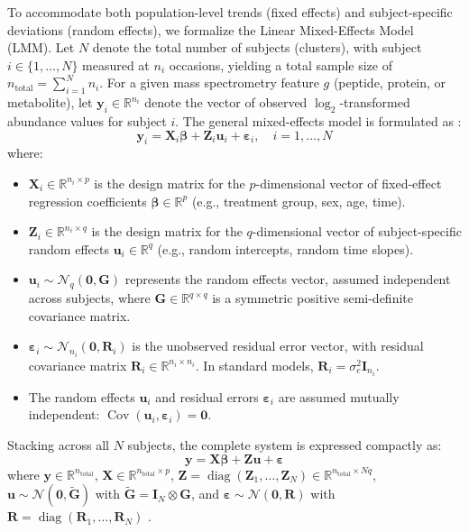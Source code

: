 \documentclass[11pt,twoside,openright]{book}
\begin{document}
To accommodate both population-level trends (fixed effects) and subject-specific deviations (random effects), we formalize the Linear Mixed-Effects Model (LMM). Let $N$ denote the total number of subjects (clusters), with subject $i \in \{1, \dots, N\}$ measured at $n_i$ occasions, yielding a total sample size of $n_{\text{total}} = \sum_{i=1}^N n_i$. For a given mass spectrometry feature $g$ (peptide, protein, or metabolite), let $\mathbf{y}_i \in \mathbb{R}^{n_i}$ denote the vector of observed $\log_2$-transformed abundance values for subject $i$. The general mixed-effects model is formulated as \cite{pinheiro2000mixed, laird1982random}:
\begin{equation}
\label{eq:lmm_subject}
\mathbf{y}_i = \mathbf{X}_i \boldsymbol{\beta} + \mathbf{Z}_i \mathbf{u}_i + \boldsymbol{\varepsilon}_i, \quad i = 1, \dots, N
\end{equation}
where:
\begin{itemize}
    \item $\mathbf{X}_i \in \mathbb{R}^{n_i \times p}$ is the design matrix for the $p$-dimensional vector of fixed-effect regression coefficients $\boldsymbol{\beta} \in \mathbb{R}^p$ (e.g., treatment group, sex, age, time).
    \item $\mathbf{Z}_i \in \mathbb{R}^{n_i \times q}$ is the design matrix for the $q$-dimensional vector of subject-specific random effects $\mathbf{u}_i \in \mathbb{R}^q$ (e.g., random intercepts, random time slopes).
    \item $\mathbf{u}_i \sim \mathcal{N}_q(\mathbf{0}, \mathbf{G})$ represents the random effects vector, assumed independent across subjects, where $\mathbf{G} \in \mathbb{R}^{q \times q}$ is a symmetric positive semi-definite covariance matrix.
    \item $\boldsymbol{\varepsilon}_i \sim \mathcal{N}_{n_i}(\mathbf{0}, \mathbf{R}_i)$ is the unobserved residual error vector, with residual covariance matrix $\mathbf{R}_i \in \mathbb{R}^{n_i \times n_i}$. In standard models, $\mathbf{R}_i = \sigma_e^2 \mathbf{I}_{n_i}$.
    \item The random effects $\mathbf{u}_i$ and residual errors $\boldsymbol{\varepsilon}_i$ are assumed mutually independent: $\operatorname{Cov}(\mathbf{u}_i, \boldsymbol{\varepsilon}_i) = \mathbf{0}$.
\end{itemize}

Stacking across all $N$ subjects, the complete system is expressed compactly as:
\begin{equation}
\label{eq:lmm_full}
\mathbf{y} = \mathbf{X} \boldsymbol{\beta} + \mathbf{Z} \mathbf{u} + \boldsymbol{\varepsilon}
\end{equation}
where $\mathbf{y} \in \mathbb{R}^{n_{\text{total}}}$, $\mathbf{X} \in \mathbb{R}^{n_{\text{total}} \times p}$, $\mathbf{Z} = \operatorname{diag}(\mathbf{Z}_1, \dots, \mathbf{Z}_N) \in \mathbb{R}^{n_{\text{total}} \times Nq}$, $\mathbf{u} \sim \mathcal{N}(\mathbf{0}, \widetilde{\mathbf{G}})$ with $\widetilde{\mathbf{G}} = \mathbf{I}_N \otimes \mathbf{G}$, and $\boldsymbol{\varepsilon} \sim \mathcal{N}(\mathbf{0}, \mathbf{R})$ with $\mathbf{R} = \operatorname{diag}(\mathbf{R}_1, \dots, \mathbf{R}_N)$ \cite{bates2015fitting}.
\end{document}
